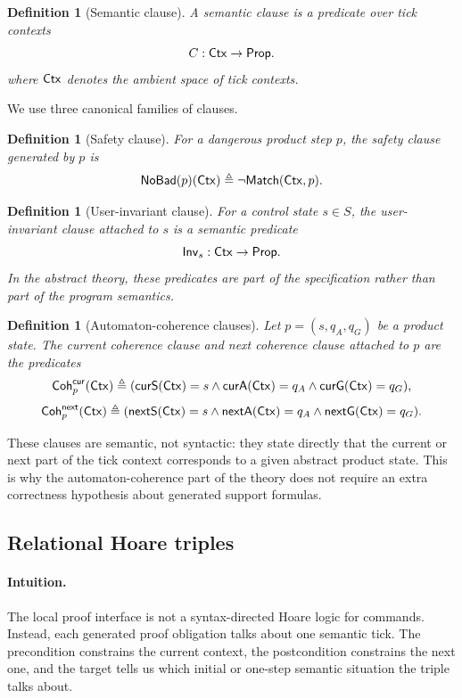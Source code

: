 \documentclass[acmsmall,screen]{acmart}
\theoremstyle{leftplain}
\theoremstyle{leftdefinition}
\newtheorem{definition}[theorem]{Definition}
\theoremstyle{leftremark}
\begin{document}
\begin{definition}[Semantic clause]
A semantic clause is a predicate over tick contexts
\[
  C : \mathsf{Ctx} \to \mathsf{Prop}.
\]
\noindent where $\mathsf{Ctx}$ denotes the ambient space of tick contexts.
\end{definition}

We use three canonical families of clauses.

\begin{definition}[Safety clause]
For a dangerous product step $p$, the safety clause generated by $p$ is
\[
  \mathsf{NoBad}(p)(\mathsf{Ctx}) \triangleq \neg \mathsf{Match}(\mathsf{Ctx},p).
\]
\end{definition}

\begin{definition}[User-invariant clause]
For a control state $s \in S$, the user-invariant clause attached to $s$ is a
semantic predicate
\[
  \mathsf{Inv}_s : \mathsf{Ctx} \to \mathsf{Prop}.
\]
In the abstract theory, these predicates are part of the specification rather
than part of the program semantics.
\end{definition}

\begin{definition}[Automaton-coherence clauses]
Let $p=(s,q_A,q_G)$ be a product state. The current coherence clause and next
coherence clause attached to $p$ are the predicates
\[
  \mathsf{Coh}^{\mathsf{cur}}_p(\mathsf{Ctx}) \triangleq
  (\mathsf{curS}(\mathsf{Ctx})=s \wedge \mathsf{curA}(\mathsf{Ctx})=q_A \wedge \mathsf{curG}(\mathsf{Ctx})=q_G),
\]
\[
  \mathsf{Coh}^{\mathsf{next}}_p(\mathsf{Ctx}) \triangleq
  (\mathsf{nextS}(\mathsf{Ctx})=s \wedge \mathsf{nextA}(\mathsf{Ctx})=q_A \wedge \mathsf{nextG}(\mathsf{Ctx})=q_G).
\]
\end{definition}

These clauses are semantic, not syntactic: they state directly that the current
or next part of the tick context corresponds to a given abstract product state.
This is why the automaton-coherence part of the theory does not require an
extra correctness hypothesis about generated support formulas.

\subsection{Relational Hoare triples}
\paragraph{Intuition.}
The local proof interface is not a syntax-directed Hoare logic for commands.
Instead, each generated proof obligation talks about one semantic tick. The
precondition constrains the current context, the postcondition constrains the
next one, and the target tells us which initial or one-step semantic situation
the triple talks about.
\end{document}
